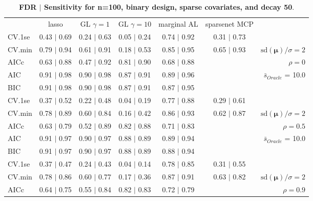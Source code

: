 \clearpage
\begin{table}\vspace{-.5cm}
\caption[l]{ {\it }
{ \bf FDR $\boldsymbol{\mid}$ Sensitivity for n=100, binary design, sparse covariates, and  decay  50}.}
\vspace{-.5cm}
\footnotesize{}
\begin{center}
\begin{tabular}{l*{5}{c}|r}
 & lasso & GL $\gamma=1$ & GL $\gamma=10$ & marginal AL & sparsenet MCP  & \\
 \cline{1-7}
CV.1se & 0.43 $\mid$ 0.69 & 0.24 $\mid$ 0.63 & 0.05 $\mid$ 0.24 & 0.74 $\mid$ 0.92 & 0.31 $\mid$ 0.73 & \\
CV.min & 0.79 $\mid$ 0.94 & 0.61 $\mid$ 0.91 & 0.18 $\mid$ 0.53 & 0.85 $\mid$ 0.95 & 0.65 $\mid$ 0.93 &  $\mathrm{sd}(\mathbf{\mu})/\sigma=2$ \\
AICc & 0.63 $\mid$ 0.88 & 0.47 $\mid$ 0.92 & 0.81 $\mid$ 0.90 & 0.68 $\mid$ 0.88 & & $\rho=0$ \\
AIC & 0.91 $\mid$ 0.98 & 0.90 $\mid$ 0.98 & 0.87 $\mid$ 0.91 & 0.89 $\mid$ 0.96 & &  \multirow{2}{*}{$\bar{s}_{Oracle}$ = 10.0} \\
BIC & 0.91 $\mid$ 0.98 & 0.90 $\mid$ 0.98 & 0.87 $\mid$ 0.91 & 0.87 $\mid$ 0.95 & &  \\
 \hline 
CV.1se & 0.37 $\mid$ 0.52 & 0.22 $\mid$ 0.48 & 0.04 $\mid$ 0.19 & 0.77 $\mid$ 0.88 & 0.29 $\mid$ 0.61 & \\
CV.min & 0.78 $\mid$ 0.89 & 0.60 $\mid$ 0.84 & 0.16 $\mid$ 0.42 & 0.86 $\mid$ 0.93 & 0.62 $\mid$ 0.87 &  $\mathrm{sd}(\mathbf{\mu})/\sigma=2$ \\
AICc & 0.63 $\mid$ 0.79 & 0.52 $\mid$ 0.89 & 0.82 $\mid$ 0.88 & 0.71 $\mid$ 0.83 & & $\rho=0.5$ \\
AIC & 0.91 $\mid$ 0.97 & 0.90 $\mid$ 0.97 & 0.88 $\mid$ 0.89 & 0.89 $\mid$ 0.94 & &  \multirow{2}{*}{$\bar{s}_{Oracle}$ = 10.0} \\
BIC & 0.91 $\mid$ 0.97 & 0.90 $\mid$ 0.97 & 0.88 $\mid$ 0.89 & 0.88 $\mid$ 0.94 & &  \\
 \hline 
CV.1se & 0.37 $\mid$ 0.47 & 0.24 $\mid$ 0.43 & 0.04 $\mid$ 0.14 & 0.78 $\mid$ 0.85 & 0.31 $\mid$ 0.55 & \\
CV.min & 0.78 $\mid$ 0.86 & 0.60 $\mid$ 0.77 & 0.17 $\mid$ 0.36 & 0.87 $\mid$ 0.91 & 0.63 $\mid$ 0.82 &  $\mathrm{sd}(\mathbf{\mu})/\sigma=2$ \\
AICc & 0.64 $\mid$ 0.75 & 0.55 $\mid$ 0.84 & 0.82 $\mid$ 0.83 & 0.72 $\mid$ 0.79 & & $\rho=0.9$ \\

\end{tabular}
\end{center}
\end{table}
